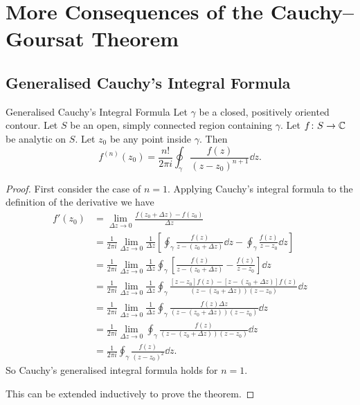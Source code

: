 \documentclass{article}
\begin{document}
    \section{More Consequences of the Cauchy--Goursat Theorem}
    \subsection{Generalised Cauchy's Integral Formula}
    \begin{theorem}{Generalised Cauchy's Integral Formula}{}
        Let \(\gamma\) be a closed, positively oriented contour.
        Let \(S\) be an open, simply connected region containing \(\gamma\).
        Let \(f\colon S\to\mathbb{C}\) be analytic on \(S\).
        Let \(z_0\) be any point inside \(\gamma\).
        Then
        \[f^{(n)}(z_0) = \frac{n!}{2\pi i} \oint_{\gamma} \frac{f(z)}{(z - z_0)^{n+1}}\dd{z}.\]
    \end{theorem}
    \begin{proof}
        First consider the case of \(n = 1\).
        Applying Cauchy's integral formula to the definition of the derivative we have
        \begin{align*}
            f'(z_0) &= \lim_{\Delta z \to 0} \frac{f(z_0 + \Delta z) - f(z_0)}{\Delta z}\\
            &= \frac{1}{2\pi i} \lim_{\Delta z \to 0} \frac{1}{\Delta z} \left[ \oint_{\gamma} \frac{f(z)}{z - (z_0 + \Delta z)}\dd{z} - \oint_{\gamma} \frac{f(z)}{z - z_0}\dd{z}\right]\\
            &= \frac{1}{2\pi i} \lim_{\Delta z \to 0} \frac{1}{\Delta z}\oint_\gamma \left[ \frac{f(z)}{z - (z_0 + \Delta z)} - \frac{f(z)}{z - z_0}\right] \dd{z}\\
            &= \frac{1}{2\pi i} \lim_{\Delta z \to 0} \frac{1}{\Delta z}\oint_\gamma \frac{[z - z_0]f(z) - [z - (z_0 + \Delta z)]f(z)}{(z - (z_0 + \Delta z))(z - z_0)} \dd{z}\\
            &= \frac{1}{2\pi i} \lim_{\Delta z \to 0} \frac{1}{\Delta z}\oint_\gamma \frac{f(z)\Delta z}{(z - (z_0 + \Delta z))(z - z_0)}\dd{z}\\
            &= \frac{1}{2\pi i} \lim_{\Delta z \to 0} \oint_\gamma \frac{f(z)}{(z - (z_0 + \Delta z))(z - z_0)}\dd{z}\\
            &= \frac{1}{2\pi i} \oint_{\gamma} \frac{f(z)}{(z - z_0)^2}\dd{z}.
        \end{align*}
        So Cauchy's generalised integral formula holds for \(n = 1\).
        
        This can be extended inductively to prove the theorem.
    \end{proof}
\end{document}
